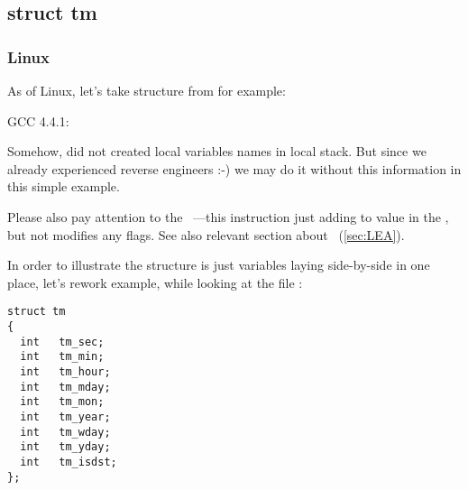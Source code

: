 \subsection{struct tm}

\subsubsection{Linux}

{As of Linux, let's take  structure from  for example:}



 GCC 4.4.1:

\IFRU{}{}

{Somehow, \IDA did not created local variables names in local stack.
But since we already experienced reverse engineers :-) we may do it without this information in 
this simple example.}

{Please also pay attention to the ~---this instruction just adding  to value in the \EAX,
but not modifies any flags. See also relevant section about \LEA{}~(\ref{sec:LEA}).}

{In order to illustrate the structure is just variables laying side-by-side in one place, let's rework
example, while looking at the file} :

\begin{lstlisting}[caption=time.h]
struct tm
{
  int	tm_sec;
  int	tm_min;
  int	tm_hour;
  int	tm_mday;
  int	tm_mon;
  int	tm_year;
  int	tm_wday;
  int	tm_yday;
  int	tm_isdst;
};
\end{lstlisting}



